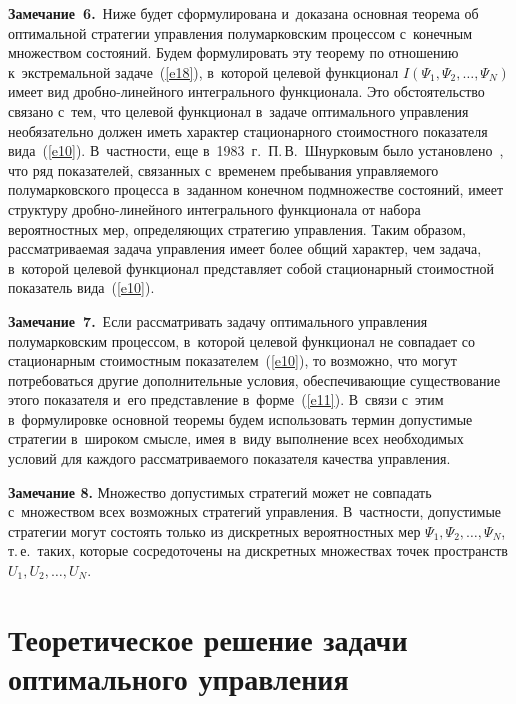 \begin{multicols}{2}
\smallskip

\noindent
\textbf{Замечание~6.}\ Ниже будет сформулирована и~доказана основная 
теорема об оптимальной стра\-тегии управления полумарковским процессом с~конеч\-ным 
множеством состояний. Будем формулировать эту теорему по отношению к~экстремальной 
задаче~(\ref{e18}), в~которой целевой функционал $I(\Psi_1, \Psi_2,\ldots,\Psi_N)$ 
имеет вид дроб\-но-ли\-ней\-но\-го интегрального функционала. 
Это обстоятельство связано с~тем, что целевой функционал в~задаче 
оптимального управления необязательно должен иметь характер стационарного 
стоимостного показателя вида~(\ref{e10}). В~частности, еще в~1983~г.\ П.\,В.~Шнурковым 
было установлено~\cite{24}, что ряд показателей, связанных 
с~временем пребывания управляемого полумарковского процесса в~заданном конечном 
подмножестве состояний, имеет структуру дроб\-но-ли\-ней\-но\-го интегрального 
функционала от набора вероятностных мер, определяющих стратегию управления. 
Таким образом, рассматриваемая задача управления имеет более общий характер, 
чем задача, в~которой целевой функционал представляет собой стационарный 
стоимостной показатель вида~(\ref{e10}).






\smallskip

\noindent
\textbf{Замечание~7.}\ Если рассматривать задачу оптимального управления 
полумарковским процессом, в~кото\-рой целевой функционал не совпадает 
со стационарным стоимостным показателем~(\ref{e10}), то возможно, что могут 
потребоваться другие дополнительные условия, обеспечивающие существование этого 
показателя и~его представление в~форме~(\ref{e11}). В~связи с~этим в~формулировке 
основной теоремы будем использовать термин допустимые стратегии в~широком смысле, 
имея в~виду выполнение всех необходимых условий для каждого рассмат\-ри\-ва\-емо\-го 
показателя качества управления.

\smallskip


\noindent
\textbf{Замечание 8.} Множество допустимых стратегий может 
не совпадать с~множеством всех возможных стратегий управления. 
В~частности, допустимые стратегии могут состоять только из дискретных вероятностных 
мер $\Psi_1, \Psi_2,\ldots,\Psi_N$, т.\,е.\ таких, которые сосредоточены на дискретных 
множествах точек пространств $U_1, U_2,\ldots,U_N$.

\section{Теоретическое решение задачи оптимального управления}


\end{multicols}
